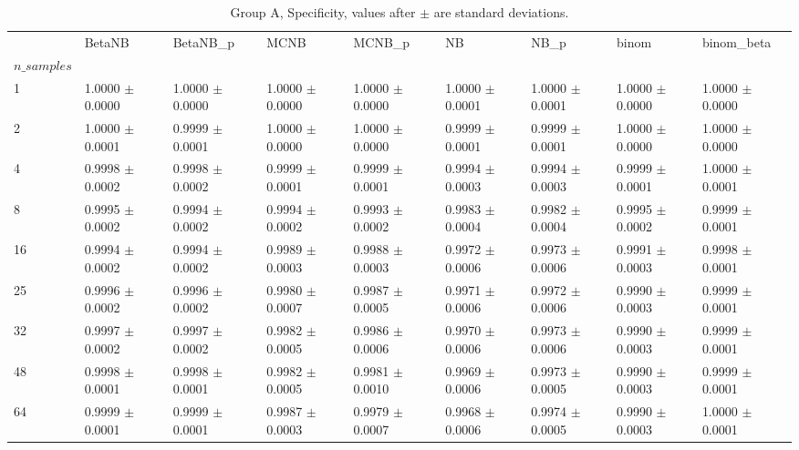 \begin{table}[H]
\centering
\begin{adjustbox}{max width=\linewidth}
\begin{tabular}{lllllllll}
\toprule
 & BetaNB & BetaNB\_p & MCNB & MCNB\_p & NB & NB\_p & binom & binom\_beta \\
$n\_samples$ &  &  &  &  &  &  &  &  \\
\midrule
1 & 1.0000 $\pm$ 0.0000 & 1.0000 $\pm$ 0.0000 & 1.0000 $\pm$ 0.0000 & 1.0000 $\pm$ 0.0000 & 1.0000 $\pm$ 0.0001 & 1.0000 $\pm$ 0.0001 & 1.0000 $\pm$ 0.0000 & 1.0000 $\pm$ 0.0000 \\
2 & 1.0000 $\pm$ 0.0001 & 0.9999 $\pm$ 0.0001 & 1.0000 $\pm$ 0.0000 & 1.0000 $\pm$ 0.0000 & 0.9999 $\pm$ 0.0001 & 0.9999 $\pm$ 0.0001 & 1.0000 $\pm$ 0.0000 & 1.0000 $\pm$ 0.0000 \\
4 & 0.9998 $\pm$ 0.0002 & 0.9998 $\pm$ 0.0002 & 0.9999 $\pm$ 0.0001 & 0.9999 $\pm$ 0.0001 & 0.9994 $\pm$ 0.0003 & 0.9994 $\pm$ 0.0003 & 0.9999 $\pm$ 0.0001 & 1.0000 $\pm$ 0.0001 \\
8 & 0.9995 $\pm$ 0.0002 & 0.9994 $\pm$ 0.0002 & 0.9994 $\pm$ 0.0002 & 0.9993 $\pm$ 0.0002 & 0.9983 $\pm$ 0.0004 & 0.9982 $\pm$ 0.0004 & 0.9995 $\pm$ 0.0002 & 0.9999 $\pm$ 0.0001 \\
16 & 0.9994 $\pm$ 0.0002 & 0.9994 $\pm$ 0.0002 & 0.9989 $\pm$ 0.0003 & 0.9988 $\pm$ 0.0003 & 0.9972 $\pm$ 0.0006 & 0.9973 $\pm$ 0.0006 & 0.9991 $\pm$ 0.0003 & 0.9998 $\pm$ 0.0001 \\
25 & 0.9996 $\pm$ 0.0002 & 0.9996 $\pm$ 0.0002 & 0.9980 $\pm$ 0.0007 & 0.9987 $\pm$ 0.0005 & 0.9971 $\pm$ 0.0006 & 0.9972 $\pm$ 0.0006 & 0.9990 $\pm$ 0.0003 & 0.9999 $\pm$ 0.0001 \\
32 & 0.9997 $\pm$ 0.0002 & 0.9997 $\pm$ 0.0002 & 0.9982 $\pm$ 0.0005 & 0.9986 $\pm$ 0.0006 & 0.9970 $\pm$ 0.0006 & 0.9973 $\pm$ 0.0006 & 0.9990 $\pm$ 0.0003 & 0.9999 $\pm$ 0.0001 \\
48 & 0.9998 $\pm$ 0.0001 & 0.9998 $\pm$ 0.0001 & 0.9982 $\pm$ 0.0005 & 0.9981 $\pm$ 0.0010 & 0.9969 $\pm$ 0.0006 & 0.9973 $\pm$ 0.0005 & 0.9990 $\pm$ 0.0003 & 0.9999 $\pm$ 0.0001 \\
64 & 0.9999 $\pm$ 0.0001 & 0.9999 $\pm$ 0.0001 & 0.9987 $\pm$ 0.0003 & 0.9979 $\pm$ 0.0007 & 0.9968 $\pm$ 0.0006 & 0.9974 $\pm$ 0.0005 & 0.9990 $\pm$ 0.0003 & 1.0000 $\pm$ 0.0001 \\
\bottomrule
\end{tabular}

\end{adjustbox}
\caption{Group A, Specificity, values after $\pm$ are standard deviations.}
\end{table}
